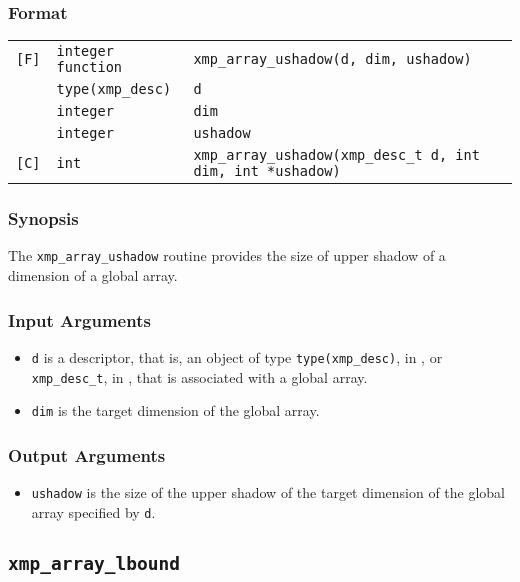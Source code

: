 \subsubsection*{Format}

\begin{tabular}{lll}

\verb![F]!& {\tt integer function}& {\tt xmp\_array\_ushadow(d, dim, ushadow)}\\
          & {\tt type(xmp\_desc)} & {\tt d}\\
          & {\tt integer} & {\tt dim}\\
          & {\tt integer} & {\tt ushadow}\\

\verb![C]!&  {\tt int}& {\tt xmp\_array\_ushadow(xmp\_desc\_t d, int dim, int *ushadow)}\\

\end{tabular}

\subsubsection*{Synopsis}

The {\tt xmp\_array\_ushadow} routine provides the size of upper shadow
of a dimension of a global array.


\subsubsection*{Input Arguments}
\begin{itemize}
 \item {\tt d} is a descriptor, that is, an object of type 
       {\tt type(xmp\_desc)}, in {\XMPF}, or {\tt xmp\_desc\_t},
       in {\XMPC}, that is associated with a global array.
 \item {\tt dim} is the target dimension of the global array.
\end{itemize}

\subsubsection*{Output Arguments}
\begin{itemize}
 \item {\tt ushadow} is the size of the upper shadow of the target
       dimension of the global array specified by {\tt d}.
\end{itemize}


\subsection{\tt xmp\_array\_lbound}

